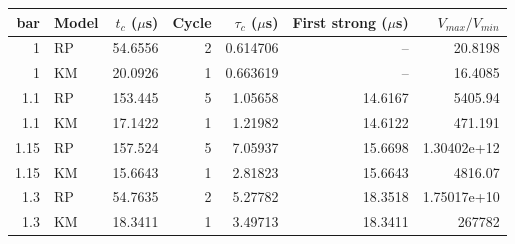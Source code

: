 \begin{tabular}{rlrrrrr}
\toprule
bar & Model & $t_c$ ($\mu$s) & Cycle & $\tau_c$ ($\mu$s) & First strong ($\mu$s) & $V_{max}/V_{min}$\\\midrule
1 & RP & 54.6556 & 2 & 0.614706 & -- & 20.8198\\
1 & KM & 20.0926 & 1 & 0.663619 & -- & 16.4085\\
1.1 & RP & 153.445 & 5 & 1.05658 & 14.6167 & 5405.94\\
1.1 & KM & 17.1422 & 1 & 1.21982 & 14.6122 & 471.191\\
1.15 & RP & 157.524 & 5 & 7.05937 & 15.6698 & 1.30402e+12\\
1.15 & KM & 15.6643 & 1 & 2.81823 & 15.6643 & 4816.07\\
1.3 & RP & 54.7635 & 2 & 5.27782 & 18.3518 & 1.75017e+10\\
1.3 & KM & 18.3411 & 1 & 3.49713 & 18.3411 & 267782\\
\bottomrule
\end{tabular}

